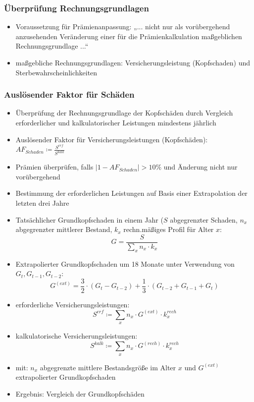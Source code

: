 \documentclass[12pt]{report}
\theoremstyle{dotless}
\theoremstyle{definition}
\begin{document}
\subsubsection{Überprüfung Rechnungsgrundlagen}
\begin{itemize}
	\item Voraussetzung für Prämienanpassung: „... nicht nur als vorübergehend anzusehenden Veränderung einer für die Prämienkalkulation ma{\ss}geblichen Rechnungsgrundlage ...“
	\item ma{\ss}gebliche Rechnungsgrundlagen: Versicherungsleistung (Kopfschaden) und Sterbewahrscheinlichkeiten
\end{itemize}

\subsubsection{Auslösender Faktor für Schäden}
\begin{itemize}
	\item Überprüfung der Rechnungsgrundlage der Kopfschäden durch Vergleich erforderlicher und kalkulatorischer Leistungen mindestens jährlich
	\item Auslösender Faktor für Versicherungsleistungen (Kopfschäden): $AF_{Schaden} \coloneqq \frac{S^{erf}}{S^{kalk}}$
	\item Prämien überprüfen, falls $|1-AF_{Schaden}|>10\%$ und Änderung nicht nur vorübergehend
	\item Bestimmung der erforderlichen Leistungen auf Basis einer Extrapolation der letzten drei Jahre
	\item Tatsächlicher Grundkopfschaden in einem Jahr ($S$ abgegrenzter Schaden, $n_x$ abgegrenzter mittlerer Bestand, $k_x$ rechn.mä{\ss}iges Profil für Alter $x$:
		\begin{equation}
			G= \frac{S}{\sum_x n_x \cdot k_x}
		\end{equation}
	\item Extrapolierter Grundkopfschaden um 18 Monate unter Verwendung von $G_t, G_{t-1}, G_{t-2}$:
	\begin{equation}
		G^{(ext)}=\frac{3}{2} \cdot (G_t - G_{t-2})+\frac{1}{3} \cdot(G_{t-2}+G_{t-1}+G_t)
	\end{equation}
	\item erforderliche Versicherungsleistungen:
		\begin{equation}
			S^{erf} \coloneqq \sum_x n_x \cdot G^{(ext)} \cdot k_x^{rech}
		\end{equation}
	\item kalkulatorische Versicherungsleistungen:
		\begin{equation}
			S^{kalk} \coloneqq \sum_x n_x \cdot G^{(rech)} \cdot k_x^{rech}
		\end{equation}
	\item mit: $n_x$ abgegrenzte mittlere Bestandsgrö{\ss}e im Alter $x$ und $G^{(ext)}$ extrapolierter Grundkopfschaden
	\item Ergebnis: Vergleich der Grundkopfschäden
\end{itemize}
\end{document}
